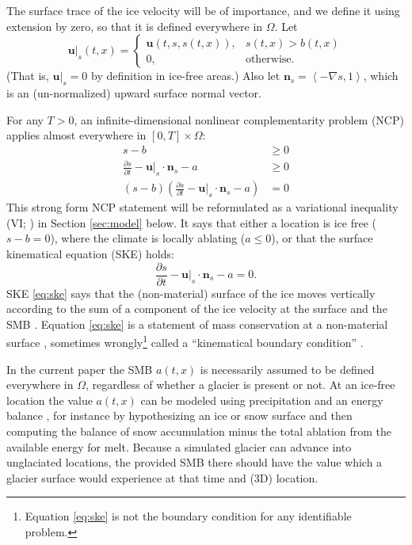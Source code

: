 \documentclass[hidelinks,onefignum,onetabnum,final]{siamart220329}  %
\newcommand{\grad}{\nabla}
\newcommand{\bn}{\mathbf{n}}
\newcommand{\bu}{\mathbf{u}}
\begin{document}
The surface trace of the ice velocity will be of importance, and we define it using extension by zero, so that it is defined everywhere in $\Omega$.  Let
\begin{equation}
\bu|_s(t,x) = \begin{cases} \bu(t,s,s(t,x)), & s(t,x)>b(t,x) \\
                            0, & \text{otherwise} .\end{cases} \label{eq:defineus}
\end{equation}
(That is, $\bu|_s=0$ by definition in ice-free areas.)  Also let $\bn_s = \left<-\grad s,1\right>$, which is an (un-normalized) upward surface normal vector.

For any $T>0$, an infinite-dimensional nonlinear complementarity problem (NCP) \cite{Bueler2021conservation,FacchineiPang2003,SchoofHewitt2013} applies almost everywhere in $[0,T]\times \Omega$:
\begin{subequations}
\label{eq:ncp}
\begin{align}
s - b &\ge 0 \\
\frac{\partial s}{\partial t} - \bu|_s \cdot \bn_s - a &\ge 0 \\
(s - b) \left(\frac{\partial s}{\partial t} - \bu|_s \cdot \bn_s - a\right) &= 0
\end{align}
\end{subequations}
This strong form NCP statement will be reformulated as a variational inequality (VI; \cite{KinderlehrerStampacchia1980}) in Section \ref{sec:model} below.  It says that either a location is ice free ($s-b=0$), where the climate is locally ablating ($a\le 0$), or that the surface kinematical equation (SKE) holds:
\begin{equation}
\frac{\partial s}{\partial t} - \bu|_s \cdot \bn_s - a = 0.  \label{eq:ske}
\end{equation}
SKE \eqref{eq:ske} says that the (non-material) surface of the ice moves vertically according to the sum of a component of the ice velocity at the surface and the SMB \cite{SchoofHewitt2013}.  Equation \eqref{eq:ske} is a statement of mass conservation at a non-material surface \cite{Aschwandenetal2012}, sometimes wrongly\footnote{Equation \eqref{eq:ske} is not the boundary condition for any identifiable problem.} called a ``kinematical boundary condition'' \cite{GreveBlatter2009}.

In the current paper the SMB $a(t,x)$ is necessarily assumed to be defined everywhere in $\Omega$, regardless of whether a glacier is present or not.  At an ice-free location the value $a(t,x)$ can be modeled using precipitation and an energy balance \cite{GreveBlatter2009}, for instance by hypothesizing an ice or snow surface and then computing the balance of snow accumulation minus the total ablation from the available energy for melt.  Because a simulated glacier can advance into unglaciated locations, the provided SMB there should have the value which a glacier surface would experience at that time and (3D) location.
\end{document}
